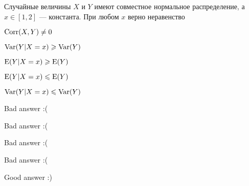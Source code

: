 
\begin{question}
Случайные величины \(X\) и \(Y\) имеют совместное нормальное
распределение, а \(x\in[1,2]\) --- константа. При любом \(x\) верно
неравенство
\begin{answerlist}
  \item \(\operatorname{Corr}(X,Y)\ne0\)
  \item \(\operatorname{Var}(Y|X=x)\geqslant \operatorname{Var}(Y)\)
  \item \(\operatorname{E}(Y|X=x)\geqslant \operatorname{E}(Y)\)
  \item \(\operatorname{E}(Y|X=x)\leqslant \operatorname{E}(Y)\)
  \item \(\operatorname{Var}(Y|X=x)\leqslant \operatorname{Var}(Y)\)
\end{answerlist}
\end{question}

\begin{solution}
\begin{answerlist}
  \item Bad answer :(
  \item Bad answer :(
  \item Bad answer :(
  \item Bad answer :(
  \item Good answer :)
\end{answerlist}
\end{solution}

